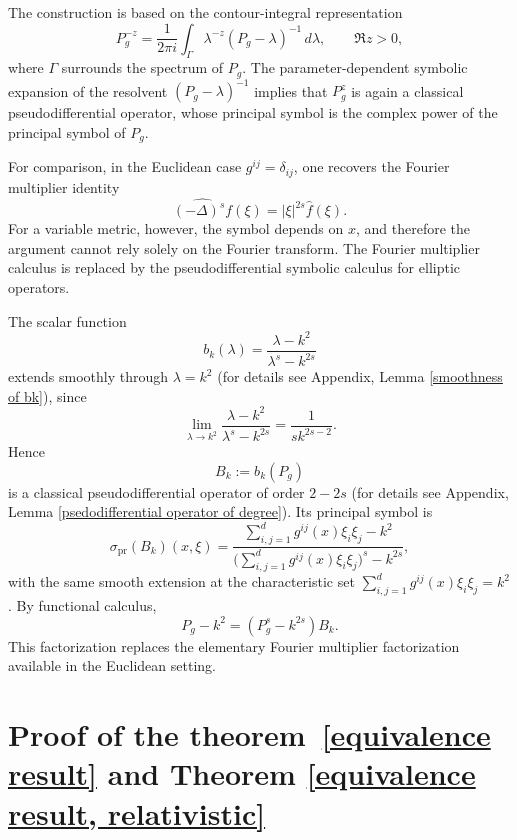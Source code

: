\documentclass[12pt]{amsart}
\numberwithin{equation}{section}
\theoremstyle{definition}
\theoremstyle{remark}
\numberwithin{equation}{section}
\begin{document}
	The construction is based on the contour-integral representation
	\[
	P_g^{-z}
	=
	\frac{1}{2\pi i}
	\int_\Gamma
	\lambda^{-z}(P_g-\lambda)^{-1}\,d\lambda,
	\qquad \Re z>0,
	\]
	where \(\Gamma\) surrounds the spectrum of \(P_g\). The parameter-dependent symbolic
	expansion of the resolvent \((P_g-\lambda)^{-1}\) implies that \(P_g^z\) is again a classical
	pseudodifferential operator, whose principal symbol is the complex power of the principal
	symbol of \(P_g\).
	
	For comparison, in the Euclidean case \(g^{ij}=\delta_{ij}\), one recovers the Fourier multiplier identity
	\[
	\widehat{(-\Delta)^s f}(\xi)=|\xi|^{2s}\widehat f(\xi).
	\]
	For a variable metric, however, the symbol depends on \(x\), and therefore the argument
	cannot rely solely on the Fourier transform. The Fourier multiplier calculus is replaced by
	the pseudodifferential symbolic calculus for elliptic operators.
	
	The scalar function
	\[
	b_k(\lambda)=\frac{\lambda-k^2}{\lambda^s-k^{2s}}
	\]
	extends smoothly through \(\lambda=k^2\) (for details see Appendix, Lemma \ref{smoothness of bk}), since
	\[
	\lim_{\lambda\to k^2}\frac{\lambda-k^2}{\lambda^s-k^{2s}}
	=
	\frac{1}{s k^{2s-2}}.
	\]
	Hence
	\[
	B_k:=b_k(P_g)
	\]
	is a classical pseudodifferential operator of order \(2-2s\) (for details see Appendix, Lemma \ref{psedodifferential operator of degree}). Its principal symbol is
	\[
	\sigma_{\mathrm{pr}}(B_k)(x,\xi)
	=
	\frac{\sum_{i,j=1}^d g^{ij}(x)\xi_i\xi_j-k^2}
	{\bigl( \sum_{i,j=1}^dg^{ij}(x)\xi_i\xi_j\bigr)^s-k^{2s}},
	\]
	with the same smooth extension at the characteristic set
	\(\displaystyle{\sum_{i,j=1}^d g^{ij}(x)\xi_i\xi_j=k^2}\). By functional calculus,
	\begin{equation}\label{factorization_identity}
		P_g-k^2=(P_g^s-k^{2s})B_k.
	\end{equation}
	This factorization replaces the elementary Fourier multiplier factorization available in the Euclidean setting.
	
	
	\section{Proof of the theorem~\ref{equivalence result} and Theorem \ref{equivalence result, relativistic}}
	
\end{document}

